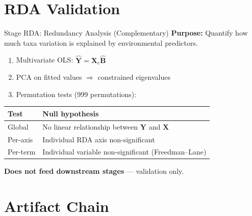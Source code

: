 \documentclass[aspectratio=169, 11pt]{beamer}
\newcommand{\mat}[1]{\mathbf{#1}}
\begin{document}
\section{RDA Validation}

\begin{frame}{Stage RDA: Redundancy Analysis (Complementary)}
  \textbf{Purpose:} Quantify how much taxa variation is explained by environmental predictors.

  \vspace{0.3em}
  \begin{enumerate}
    \item Multivariate OLS: $\hat{\mat{Y}} = \mat{X}_c\hat{\mat{B}}$
    \item PCA on fitted values $\Rightarrow$ constrained eigenvalues
    \item Permutation tests (999 permutations):
  \end{enumerate}

  \vspace{0.3em}
  \begin{center}\small
  \begin{tabular}{lp{8cm}}
    \toprule
    Test & Null hypothesis \\
    \midrule
    Global   & No linear relationship between $\mat{Y}$ and $\mat{X}$ \\
    Per-axis & Individual RDA axis non-significant \\
    Per-term & Individual variable non-significant (Freedman--Lane) \\
    \bottomrule
  \end{tabular}
  \end{center}

  \vspace{0.3em}
  \textbf{Does not feed downstream stages} --- validation only.
\end{frame}

\section{Artifact Chain}
\end{document}
